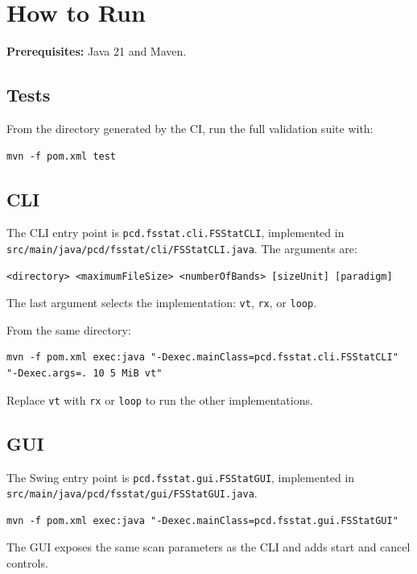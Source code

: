 \clearpage
\section{How to Run}

\textbf{Prerequisites:} Java 21 and Maven.

\subsection{Tests}

From the directory generated by the CI, run the full validation suite with:

\begin{verbatim}
mvn -f pom.xml test
\end{verbatim}

\subsection{CLI}

The CLI entry point is \texttt{pcd.fsstat.cli.FSStatCLI}, implemented in
\texttt{src/main/java/pcd/fsstat/cli/FSStatCLI.java}. The arguments are:

\begin{verbatim}
<directory> <maximumFileSize> <numberOfBands> [sizeUnit] [paradigm]
\end{verbatim}

The last argument selects the implementation: \texttt{vt}, \texttt{rx}, or
\texttt{loop}.

From the same directory:

\small
\begin{verbatim}
mvn -f pom.xml exec:java "-Dexec.mainClass=pcd.fsstat.cli.FSStatCLI" "-Dexec.args=. 10 5 MiB vt"
\end{verbatim}
\normalsize

Replace \texttt{vt} with \texttt{rx} or \texttt{loop} to run the other
implementations.

\subsection{GUI}

The Swing entry point is \texttt{pcd.fsstat.gui.FSStatGUI}, implemented in
\texttt{src/main/java/pcd/fsstat/gui/FSStatGUI.java}.

\small
\begin{verbatim}
mvn -f pom.xml exec:java "-Dexec.mainClass=pcd.fsstat.gui.FSStatGUI"
\end{verbatim}
\normalsize

The GUI exposes the same scan parameters as the CLI and adds start and cancel
controls.
